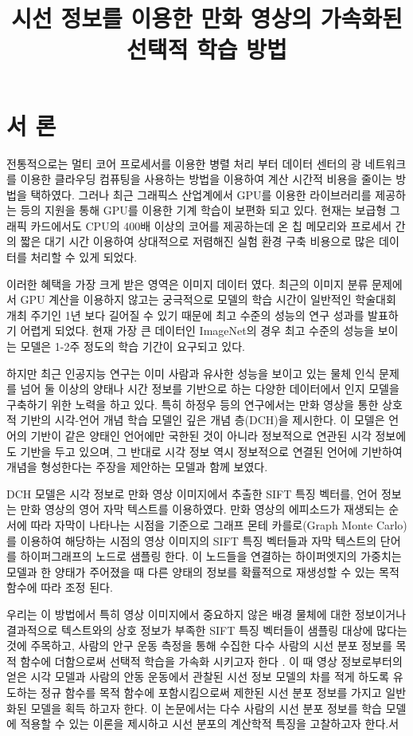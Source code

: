 \documentclass{kcc}
\title{시선 정보를 이용한 만화 영상의 가속화된 선택적 학습 방법}
\author{
}
\begin{document}
\maketitle


\section{서 론}
전통적으로는 멀티 코어 프로세서를 이용한 병렬 처리 부터 데이터 센터의 광 네트워크를 이용한 클라우딩 컴퓨팅을 사용하는 방법을 이용하여 계산 시간적 비용을 줄이는 방법을 택하였다. 그러나 최근 그래픽스 산업계에서 GPU를 이용한 라이브러리를 제공하는 등의 지원을 통해 GPU를 이용한 기계 학습이 보편화 되고 있다. 현재는 보급형 그래픽 카드에서도 CPU의 400배 이상의 코어를 제공하는데 온 칩 메모리와 프로세서 간의 짧은 대기 시간 이용하여 상대적으로 저렴해진 실험 환경 구축 비용으로 많은 데이터를 처리할 수 있게 되었다.

이러한 혜택을 가장 크게 받은 영역은 이미지 데이터 였다. 최근의 이미지 분류 문제에서 GPU 계산을 이용하지 않고는 궁극적으로 모델의 학습 시간이 일반적인 학술대회 개최 주기인 1년 보다 길어질 수 있기 때문에 최고 수준의 성능의 연구 성과를 발표하기 어렵게 되었다. 현재 가장 큰 데이터인 ImageNet의 경우 최고 수준의 성능을 보이는 모델은 1-2주 정도의 학습 기간이 요구되고 있다.

하지만 최근 인공지능 연구는 이미 사람과 유사한 성능을 보이고 있는 물체 인식 문제를 넘어 둘 이상의 양태나 시간 정보를 기반으로 하는 다양한 데이터에서 인지 모델을 구축하기 위한 노력을 하고 있다. 특히 하정우 등\cite{Ha2015}의 연구에서는 만화 영상을 통한 상호적 기반의 시각-언어 개념 학습 모델인 깊은 개념 층(DCH)을 제시한다. 이 모델은 언어의 기반이 같은 양태인 언어에만 국한된 것이 아니라 정보적으로 연관된 시각 정보에도 기반을 두고 있으며, 그 반대로 시각 정보 역시 정보적으로 연결된 언어에 기반하여 개념을 형성한다는 주장을 제안하는 모델과 함께 보였다. 

DCH 모델은 시각 정보로 만화 영상 이미지에서 추출한 SIFT 특징 벡터를, 언어 정보는 만화 영상의 영어 자막 텍스트를 이용하였다. 만화 영상의 에피소드가 재생되는 순서에 따라 자막이 나타나는 시점을 기준으로 그래프 몬테 카를로(Graph Monte Carlo)를 이용하여 해당하는 시점의 영상 이미지의 SIFT 특징 벡터들과 자막 텍스트의 단어를 하이퍼그래프의 노드로 샘플링 한다. 이 노드들을 연결하는 하이퍼엣지의 가중치는 모델과 한 양태가 주어졌을 때 다른 양태의 정보를 확률적으로 재생성할 수 있는 목적 함수에 따라 조정 된다. 

우리는 이 방법에서 특히 영상 이미지에서 중요하지 않은 배경 물체에 대한 정보이거나 결과적으로 텍스트와의 상호 정보가 부족한 SIFT 특징 벡터들이 샘플링 대상에 많다는 것에 주목하고, 사람의 안구 운동 측정을 통해 수집한 다수 사람의 시선 분포 정보를 목적 함수에 더함으로써 선택적 학습을 가속화 시키고자 한다 \cite{Oh2011}. 이 때 영상 정보로부터의 얻은 시각 모델과 사람의 안동 운동에서 관찰된 시선 정보 모델의 차를 적게 하도록 유도하는 정규 함수를 목적 함수에 포함시킴으로써 제한된 시선 분포 정보를 가지고 일반화된 모델을 획득 하고자 한다. 이 논문에서는 다수 사람의 시선 분포 정보를 학습 모델에 적용할 수 있는 이론을 제시하고 시선 분포의 계산학적 특징을 고찰하고자 한다.서
\end{document}
